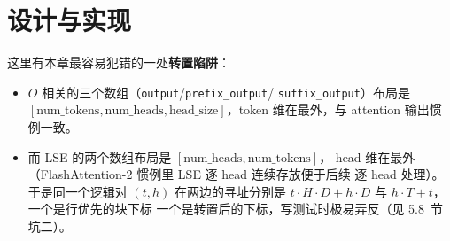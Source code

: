\section{设计与实现}



这里有本章最容易犯错的一处\textbf{转置陷阱}：
\begin{itemize}
  \item $O$ 相关的三个数组（\texttt{output}/\texttt{prefix\_\allowbreak{}output}/
        \texttt{suffix\_\allowbreak{}output}）布局是 $[\text{num\_tokens}, \text{num\_heads},
        \text{head\_size}]$，token 维在最外，与 attention 输出惯例一致。
  \item 而 LSE 的两个数组布局是 $[\text{num\_heads}, \text{num\_tokens}]$，
        head 维在最外（FlashAttention-2 惯例里 LSE 逐 head 连续存放便于后续
        逐 head 处理）。于是同一个逻辑对 $(t, h)$ 在两边的寻址分别是
        $t \cdot H \cdot D + h \cdot D$ 与 $h \cdot T + t$，一个是行优先的块下标
        一个是转置后的下标，写测试时极易弄反（见 5.8~节坑二）。
\end{itemize}

